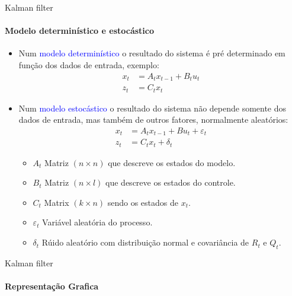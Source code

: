 \documentclass{beamer}
\begin{document}
\begin{frame}{Kalman filter}
    \framesubtitle{Modelo determinístico e estocástico}
    \begin{itemize}
        \item Num \textcolor{blue}{modelo determinístico} o resultado do sistema é pré determinado em função dos dados de entrada, exemplo:
        \begin{align*} 
            x_t &= A_t x_{t-1} + B_t u_t\\ 
            z_t &= C_t x_t
        \end{align*}
        \item Num \textcolor{blue}{modelo estocástico} o resultado do sistema não depende somente dos dados de entrada, mas também de outros fatores, normalmente
        aleatórios:
        \begin{align} 
            x_t &= A_t x_{t-1} + B u_t +  \varepsilon_t\\ 
            z_t &= C_t x_t + \delta_t
        \end{align}
        \begin{itemize}
            \item $A_t$ Matriz $(n \times n)$ que descreve os estados do modelo.
            \item $B_t$ Matriz $(n \times l)$ que descreve os estados do controle.
            \item $C_t$ Matrix $(k\times n)$ sendo os estados de $x_t$.
            \item $ \varepsilon_t$ Variável aleatória do processo.
            \item $\delta_t$ Rúido aleatório com distribuição normal e covariância de $R_t$ e $Q_t$.
        \end{itemize}
    \end{itemize}
\end{frame}


\begin{frame}{Kalman filter}
    \framesubtitle{Representação Grafica}
    
\end{frame}
\end{document}
